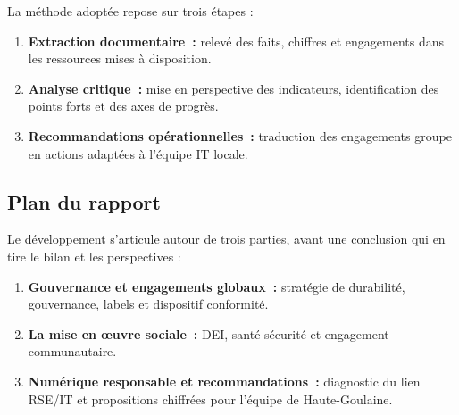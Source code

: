 La méthode adoptée repose sur trois étapes :

\begin{enumerate}
    \item \textbf{Extraction documentaire~:} relevé des faits, chiffres et engagements dans les ressources mises à disposition.
    \item \textbf{Analyse critique~:} mise en perspective des indicateurs, identification des points forts et des axes de progrès.
    \item \textbf{Recommandations opérationnelles~:} traduction des engagements groupe en actions adaptées à l'équipe IT locale.
\end{enumerate}

\subsection*{Plan du rapport}

Le développement s'articule autour de trois parties, avant une conclusion qui en tire le bilan et les perspectives :

\begin{enumerate}
    \item \textbf{Gouvernance et engagements globaux~:} stratégie de durabilité, gouvernance, labels et dispositif conformité.
    \item \textbf{La mise en \oe{}uvre sociale~:} DEI, santé-sécurité et engagement communautaire.
    \item \textbf{Numérique responsable et recommandations~:} diagnostic du lien RSE/IT et propositions chiffrées pour l'équipe de Haute-Goulaine.
\end{enumerate}
